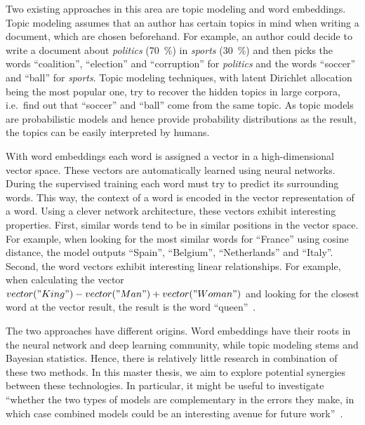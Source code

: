 \documentclass[
        a4paper,
        titlepage,
        twoside,
        parskip
        ]{scrbook}
\theoremstyle{break}
\begin{document}
Two existing approaches in this area are topic modeling and word embeddings.
Topic modeling assumes that an author has certain topics in mind when writing a document, which are chosen beforehand.
For example, an author could decide to write a document about \emph{politics} (70~\%) in \emph{sports} (30~\%) and then picks the words ``coalition'', ``election'' and ``corruption'' for \emph{politics} and the words ``soccer'' and ``ball'' for \emph{sports}.
Topic modeling techniques, with latent Dirichlet allocation being the most popular one, try to recover the hidden topics in large corpora, i.e.\ find out that ``soccer'' and ``ball'' come from the same topic.
As topic models are probabilistic models and hence provide probability distributions as the result, the topics can be easily interpreted by humans.

With word embeddings each word is assigned a vector in a high-dimensional vector space.
These vectors are automatically learned using neural networks.
During the supervised training each word must try to predict its surrounding words.
This way, the context of a word is encoded in the vector representation of a word.
Using a clever network architecture, these vectors exhibit interesting properties.
First, similar words tend to be in similar positions in the vector space.
For example, when looking for the most similar words for ``France'' using cosine distance, the model outputs ``Spain'', ``Belgium'', ``Netherlands'' and ``Italy''.
Second, the word vectors exhibit interesting linear relationships.
For example, when calculating the vector $vector("King") - vector("Man") + vector("Woman")$ and looking for the closest word at the vector result, the result is the word ``queen''~\cite{Mikolov2013b}.

The two approaches have different origins.
Word embeddings have their roots in the neural network and deep learning community, while topic modeling stems and Bayesian statistics.
Hence, there is relatively little research in combination of these two methods.
In this master thesis, we aim to explore potential synergies between these technologies.
In particular, it might be useful to investigate ``whether the two types of models are complementary in the errors they make, in which case combined models could be an interesting avenue for future work''~\cite{Baroni2014}.
\end{document}
